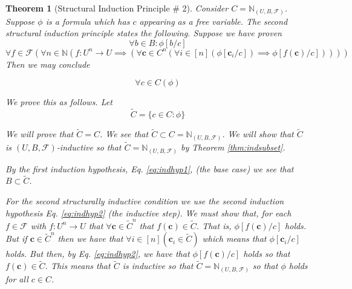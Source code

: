 \documentclass[12pt]{article}
\theoremstyle{break}
\theoremstyle{break}
\newtheorem{theorem}{Theorem}[section]
\theoremstyle{break}
\theoremstyle{break}
\theoremstyle{break}
\newtheorem{informal definition}[definition]{Informal Definition}
\newcommand{\bv}[1]{\boldsymbol{#1}}
\begin{document}
\begin{theorem}[Structural Induction Principle \# 2]
Consider $C = \mathbb{N}_{(U, B, \mathcal{F})}$.
Suppose $\phi$ is a formula which has $c$ appearing as a free variable.
The second structural induction principle states the following.
Suppose we have proven
\begin{equation}
\tag{IH1}
\label{eq:indhyp1}
\forall b \in B: \phi[b/c]
\end{equation}
\small
\begin{equation}
\tag{IH2}
\label{eq:indhyp2}
\forall f \in \mathcal{F}(\forall n \in \mathbb{N}(f:U^n \to U \implies (\forall \bv{c}\in C^n(\forall i \in [n](\phi[\bv{c}_i/c]) \implies \phi[f(\bv{c})/c]))))
\end{equation}
\normalsize
Then we may conclude

$$
\forall c \in C (\phi)
$$

We prove this as follows.
Let
$$
\tilde{C} = \{c \in C:\phi\}
$$

We will prove that $\tilde{C} = C$.
We see that $\tilde{C} \subset C = \mathbb{N}_{(U, B, \mathcal{F})}$.
We will show that $\tilde{C}$ is $(U, B, \mathcal{F})$-inductive so that $\tilde{C} = \mathbb{N}_{(U, B, \mathcal{F})}$ by Theorem \ref{thm:indsubset}.

By the first induction hypothesis, Eq. \ref{eq:indhyp1}, (the base case) we see that $B\subset \tilde{C}$.

For the second structurally inductive condition we use the second induction hypothesis Eq. \ref{eq:indhyp2} (the inductive step).
We must show that, for each $f\in \mathcal{F}$ with $f:U^n \to U$ that $\forall \bv{c} \in \tilde{C}^n$ that $f(\bv{c})\in \tilde{C}$.
That is, $\phi[f(\bv{c})/c]$ holds.
But if $\bv{c}\in \tilde{C}^n$ then we have that $\forall i \in [n] (\bv{c}_i \in \tilde{C})$ which means that $\phi[\bv{c}_i/c]$ holds.
But then, by Eq. \ref{eq:indhyp2}, we have that $\phi[f(\bv{c})/c]$ holds so that $f(\bv{c}) \in \tilde{C}$.
This means that $\tilde{C}$ is inductive so that $\tilde{C} = \mathbb{N}_{(U, B, \mathcal{F})}$ so that $\phi$ holds for all $c \in C$.

\end{theorem}
\end{document}
